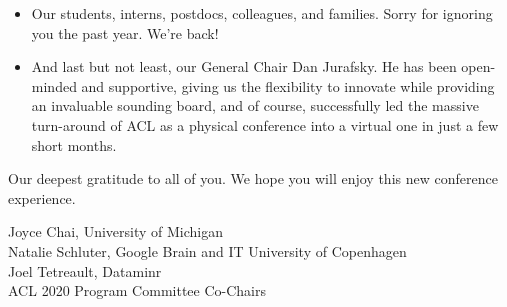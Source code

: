 \begin{itemize}
\item Our students, interns, postdocs, colleagues, and families.  Sorry for ignoring you the past year.  We're back!

\item And last but not least, our General Chair Dan Jurafsky.  He has been open-minded and supportive, giving us the flexibility to innovate while providing an invaluable sounding board, and of course, successfully led the massive turn-around of ACL as a physical conference into a virtual one in just a few short months.

\end{itemize}

Our deepest gratitude to all of you. We hope you will enjoy this new conference experience. 
 
\bigskip
\noindent Joyce Chai, University of Michigan \\
\noindent Natalie Schluter, Google Brain and IT University of Copenhagen \\
\noindent Joel Tetreault, Dataminr \\

\noindent ACL 2020 Program Committee Co-Chairs
